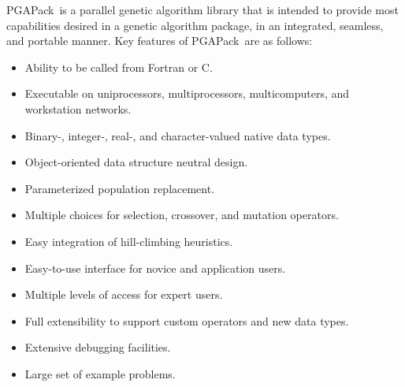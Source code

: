 \documentclass{report}
\newcommand{\pga}{PGAPack}
\begin{document}
\pga\ is a parallel genetic algorithm library that is intended to provide most
capabilities desired in a genetic algorithm package, in an integrated,
seamless, and portable manner.  Key features of \pga\ are as follows:
\begin{itemize}
\item Ability to be called from Fortran or C.
\item Executable on uniprocessors, multiprocessors, multicomputers, and workstation
networks.
\item Binary-, integer-, real-, and character-valued native data types.
\item Object-oriented data structure neutral design. 
\item Parameterized population replacement.
\item Multiple choices for selection, crossover, and mutation operators.
\item Easy integration of hill-climbing heuristics. 
\item Easy-to-use  interface for novice and application users.
\item Multiple levels of access for expert users.
\item Full extensibility to support custom operators and new data types.
\item Extensive debugging facilities.
\item Large set of example problems.
\end{itemize}

\end{document}
